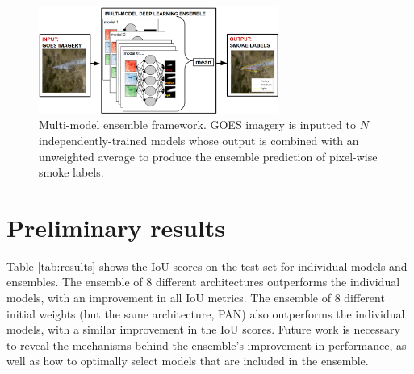\documentclass{article}
\begin{document}

\begin{figure}
    \centering
    \includegraphics[width=0.7\textwidth]{ensemble_framework.png}
    \caption{\RaggedRight Multi-model ensemble framework. GOES imagery is inputted to $N$ independently-trained models whose output is combined with an unweighted average to produce the ensemble prediction of pixel-wise smoke labels.}
    \label{fig:ensemble_framework}
\end{figure}
\section{Preliminary results}
Table \ref{tab:results} shows the IoU scores on the test set for individual models and ensembles. The ensemble of 8 different architectures outperforms the individual models, with an improvement in all IoU metrics. The ensemble of 8 different initial weights (but the same architecture, PAN) also outperforms the individual models, with a similar improvement in the IoU scores. Future work is necessary to reveal the mechanisms behind the ensemble's improvement in performance, as well as how to optimally select models that are included in the ensemble.
\end{document}
